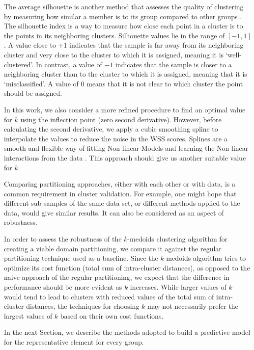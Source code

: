 The average silhouette is another method that assesses the quality of clustering by measuring how similar a member is to its group compared to other groups \cite{Rousseeuw1987}. The silhouette index is a way to measure how close each point in a cluster is to the points in its neighboring clusters.  Silhouette values lie in the range of $[-1, 1]$. A value close to $+1$ indicates that the sample is far away from its neighboring cluster and very close to the cluster to which it is assigned, meaning it is `well-clustered'. In contrast, a value of $-1$ indicates that the sample is closer to a neighboring cluster than to the cluster to which it is assigned, meaning that it is `misclassified'. A value of $0$ means that it is not clear to which cluster the point should be assigned. 

In this work, we also consider a more refined procedure to find an optimal value for $k$ using the inflection point (zero second derivative). However, before calculating the second derivative, we apply a cubic smoothing spline to interpolate the values to reduce the noise in the WSS scores. Splines are a smooth and flexible way of fitting Non-linear Models and learning the Non-linear interactions from the data \cite{HastieTF2009}. This approach should give us another suitable value for $k$.

Comparing partitioning approaches, either with each other or with data, is a common requirement in cluster validation. For example, one might hope that different sub-samples of the same data set, or different methods applied to the data, would give similar results. It can also be considered as an aspect of robustness.

In order to assess the robustness of the $k$-medoids clustering algorithm for creating a viable domain partitioning, we compare it against the regular partitioning technique used as a baseline. Since the $k$-medoids algorithm tries to optimize its cost function (total sum of intra-cluster distances), as opposed to the naive approach of the regular partitioning, we expect that the difference in performance should be more evident as $k$ increases. While larger values of $k$ would tend to lead to clusters with reduced values of the total sum of intra-cluster distances, the techniques for choosing $k$ may not necessarily prefer the largest values of $k$ based on their own cost functions.

In the next Section, we describe the methods adopted to build a predictive model for the representative element for every group.

